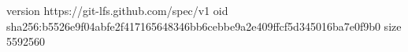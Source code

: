 version https://git-lfs.github.com/spec/v1
oid sha256:b5526e9f04abfe2f417165648346bb6cebbe9a2e409ffcf5d345016ba7e0f9b0
size 5592560
